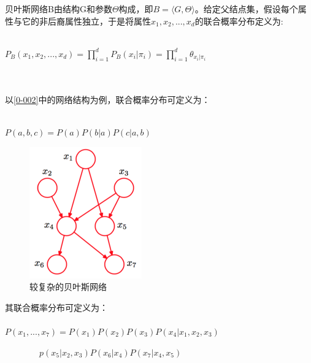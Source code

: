 \begin{frame}
	贝叶斯网络B由结构G和参数$\Theta$构成，即$B=\langle G, \Theta\rangle$。给定父结点集，假设每个属性与它的非后裔属性独立，于是将属性$x_1, x_2, ..., x_d$的联合概率分布定义为:
	~\\
	~\\
	\centerline{{\large $P_B(x_1,x_2,...,x_d)=\prod_{i=1}^{d}P_B(x_i|\pi_i)=\prod_{i=1}^{d}\theta_{x_i|\pi_i}$}}
	~\\
	~\\
	以\ref{0-002}中的网络结构为例，联合概率分布可定义为：
	~\\
	~\\
	\centerline{{\large $P(a,b,c)=P(a)P(b|a)P(c|a,b)$}}
\end{frame}

\begin{frame}
\begin{figure}
	\centering
	\includegraphics[scale=0.7]{pic/bayesian.png}
	\caption{较复杂的贝叶斯网络}
	\label{0-003}
\end{figure}
\end{frame}

\begin{frame}
	其联合概率分布可定义为：
	~\\
	~\\
	$P(x_1,...,x_7)=P(x_1)P(x_2)P(x_3)P(x_4|x_1,x_2,x_3)$
	\centerline{$\qquad\qquad p(x_5|x_2,x_3)P(x_6|x_4)P(x_7|x_4,x_5)$}
\end{frame}
	
